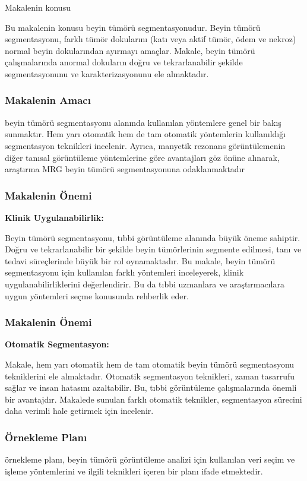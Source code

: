 \documentclass[10pt,xcolor=dvipsnames]{beamer}
\begin{document}
\begin{frame}{Makalenin konusu}

Bu makalenin konusu beyin tümörü segmentasyonudur. Beyin tümörü segmentasyonu, farklı tümör dokularını (katı veya aktif tümör, ödem ve nekroz) normal beyin dokularından ayırmayı amaçlar. Makale, beyin tümörü çalışmalarında anormal dokuların doğru ve tekrarlanabilir şekilde segmentasyonunu ve karakterizasyonunu ele almaktadır.

\end{frame}


\begin{frame}
\frametitle{Makalenin Amacı}
beyin tümörü segmentasyonu alanında kullanılan yöntemlere genel bir bakış sunmaktır. Hem yarı otomatik hem de tam otomatik yöntemlerin kullanıldığı segmentasyon teknikleri incelenir. Ayrıca, manyetik rezonans görüntülemenin diğer tanısal görüntüleme yöntemlerine göre avantajları göz önüne alınarak, araştırma MRG beyin tümörü segmentasyonuna odaklanmaktadır
\end{frame}


\begin{frame}
\frametitle{Makalenin Önemi }
\textbf{Klinik Uygulanabilirlik:}

Beyin tümörü segmentasyonu, tıbbi görüntüleme alanında büyük öneme sahiptir. Doğru ve tekrarlanabilir bir şekilde beyin tümörlerinin segmente edilmesi, tanı ve tedavi süreçlerinde büyük bir rol oynamaktadır. Bu makale, beyin tümörü segmentasyonu için kullanılan farklı yöntemleri inceleyerek, klinik uygulanabilirliklerini değerlendirir. Bu da tıbbi uzmanlara ve araştırmacılara uygun yöntemleri seçme konusunda rehberlik eder.
\end{frame}

\begin{frame}
\frametitle{Makalenin Önemi }
\textbf{Otomatik Segmentasyon:}

Makale, hem yarı otomatik hem de tam otomatik beyin tümörü segmentasyonu tekniklerini ele almaktadır. Otomatik segmentasyon teknikleri, zaman tasarrufu sağlar ve insan hatasını azaltabilir. Bu, tıbbi görüntüleme çalışmalarında önemli bir avantajdır. Makalede sunulan farklı otomatik teknikler, segmentasyon sürecini daha verimli hale getirmek için incelenir.
\end{frame}



\begin{frame}
\frametitle{Örnekleme Planı}
örnekleme planı, beyin tümörü görüntüleme analizi için kullanılan veri seçim ve işleme yöntemlerini ve ilgili teknikleri içeren bir planı ifade etmektedir.

\end{frame}
\end{document}
